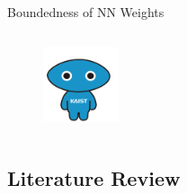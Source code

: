 \documentclass[8pt, aspectratio=169]{beamer}
\begin{document}
\begin{frame}{\insertsubsectionhead}{Boundedness of NN Weights}
\begin{enumerate}
\begin{columns}[T,onlytextwidth]
          \begin{figure}
            \includegraphics[width=0.4\textwidth]{figures/KAIST-hi.png}
          \end{figure}
      \end{columns}
  \end{enumerate}
\end{frame}


\subsection{Literature Review}
\end{document}
